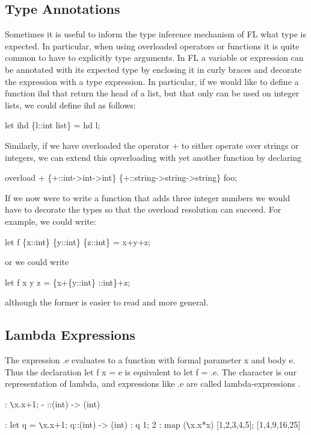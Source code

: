\subsection{Type Annotations}
Sometimes it is useful to inform the type inference mechanism
of FL what type is expected.
In particular, when using overloaded%
%
{} operators or functions
it is quite common to have to explicitly type arguments.
In FL a variable or expression can be annotated%
%
{} with its expected
type by enclosing it in curly braces and decorate the expression
with a type expression.
In particular, if we would like to define a function ihd that
return the head of a list, but that only can be used on integer lists,
we could define ihd as follows:
\begin{hol}
let ihd \{l::int list\} = hd l;
\end{hol}
Similarly, if we have overloaded the operator + to either
operate over strings or integers, we can extend this opverloading
with yet another function by declaring
\begin{hol}
overload + \{+::int->int->int\} \{+::string->string->string\} foo;
\end{hol}
If we now were to write a function that adds three integer numbers
we would have to decorate the types so that the overload resolution
can succeed. For example, we could write:
\begin{hol}
let f \{x::int\} \{y::int\} \{z::int\} = x+y+z;
\end{hol}
or we could write
\begin{hol}
let f x y z = \{x+\{y::int\} ::int\}+z;
\end{hol}
although the former is easier to read and more general.

\subsection{Lambda Expressions}

The expression \verb@\@x.e evaluates to a function with formal parameter x
and body e. Thus the
declaration let f x = e is equivalent to let f = \verb@\@x.e. The character
\verb@\@ is our representation of lambda,
and expressions like \verb@\@x.e are called lambda-expressions%
%
{}.
\begin{hol}
: \verb!\!x.x+1;
- ::(int) -> (int)

: let q = \verb!\!x.x+1;
q::(int) -> (int)
: q 1;
2
: map (\verb!\!x.x*x) [1,2,3,4,5];
[1,4,9,16,25]
\end{hol}

